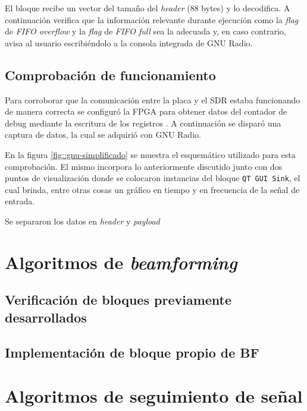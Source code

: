 \documentclass[../../main.tex]{subfiles}
\begin{document}
El bloque recibe un vector del tamaño del \textit{header} (88 bytes) y lo decodifica. A continuación verifica que la información relevante durante ejecución como la \textit{flag} de \textit{FIFO overflow} y la \textit{flag} de \textit{FIFO full} sea la adecuada y, en caso contrario, avisa al usuario escribiéndolo a la consola integrada de GNU Radio.


\subsection{Comprobación de funcionamiento}
Para corroborar que la comunicación entre la placa y el SDR estaba funcionando de manera correcta se configuró la FPGA para obtener datos del contador de debug mediante la escritura de los registros . A continuación se disparó una captura de datos, la cual se adquirió con GNU Radio.

En la figura \ref{fig::gnu-simplificado} se muestra el esquemático utilizado para esta comprobación. El mismo incorpora lo anteriormente discutido junto con dos puntos de visualización donde se colocaron instancias del bloque \texttt{QT GUI Sink}, el cual brinda, entre otras cosas un gráfico en tiempo y en frecuencia de la señal de entrada.

Se separaron los datos en \textit{header} y \textit{payload}





\section{Algoritmos de \textit{beamforming}}
\subsection{Verificación de bloques previamente desarrollados}
\subsection{Implementación de bloque propio de BF}

\section{Algoritmos de seguimiento de señal}
\end{document}
